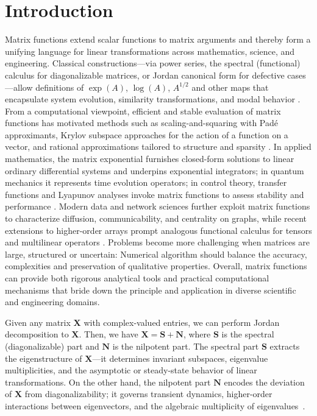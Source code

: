 \documentclass[11pt]{article}
\begin{document}
\section{Introduction}\label{sec: Introduction}


Matrix functions extend scalar functions to matrix arguments and thereby form a unifying language for linear transformations across mathematics, science, and engineering. Classical constructions—via power series, the spectral (functional) calculus for diagonalizable matrices, or Jordan canonical form for defective cases—allow definitions of $\exp(A)$, $\log(A)$, $A^{1/2}$ and other maps that encapsulate system evolution, similarity transformations, and modal behavior \cite{Higham2008}. From a computational viewpoint, efficient and stable evaluation of matrix functions has motivated methods such as scaling-and-squaring with Padé approximants, Krylov subspace approaches for the action of a function on a vector, and rational approximations tailored to structure and sparsity \cite{Moler2003,AlMohy2011}. In applied mathematics, the matrix exponential furnishes closed-form solutions to linear ordinary differential systems and underpins exponential integrators; in quantum mechanics it represents time evolution operators; in control theory, transfer functions and Lyapunov analyses invoke matrix functions to assess stability and performance \cite{Golub2013}. Modern data and network sciences further exploit matrix functions to characterize diffusion, communicability, and centrality on graphs, while recent extensions to higher-order arrays prompt analogous functional calculus for tensors and multilinear operators \cite{chang2024operatorChar,chang2024generalizedCDJ}. Problems become more challenging when matrices are large, structured or uncertain: Numerical algorithm should balance the accuracy, complexities and preservation of qualitative properties. Overall, matrix functions can provide both rigorous analytical tools and practical computational mechanisms that bride down the principle and application in diverse scientific and engineering domains.


Given any matrix $\bm{X}$ with complex-valued entries, we can perform Jordan decomposition to $\bm{X}$. Then, we have $\bm{X} = \bm{S} + \bm{N}$, where $\bm{S}$ is the spectral (diagonalizable) part and $\bm{N}$ is the  nilpotent part. The spectral part $\bm{S}$ extracts the eigenstructure of $\bm{X}$—it determines invariant subspaces, eigenvalue multiplicities, and the asymptotic or steady-state behavior of linear transformations. On the other hand, the nilpotent part $\bm{N}$ encodes the deviation of $\bm{X}$ from diagonalizability; it governs transient dynamics, higher-order interactions between eigenvectors, and the algebraic multiplicity of eigenvalues~\cite{Putzer1966,chang2024operatorChar}.  
\end{document}
